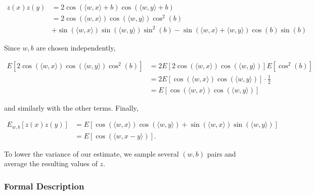 \begin{align*}
z(x)z(y) &= 2\cos(\langle w,x\rangle+b)\cos(\langle w,y\rangle+b)\\
			&= 2\cos(\langle w,x\rangle)\cos(\langle w,y\rangle)\cos^2(b) \\
				& +\sin(\langle w, x\rangle)\sin(\langle w, y\rangle)\sin^2(b) - \sin(\langle w, x\rangle+\langle w, y\rangle)\cos(b)\sin(b)
\end{align*}

Since $w,b$ are chosen independently,

\begin{align*}
E[2\cos(\langle w,x\rangle)\cos(\langle w,y\rangle)\cos^2(b)] &= 2E[2\cos(\langle w,x\rangle)\cos(\langle w,y\rangle)]E[\cos^2(b)]\\
	&= 2E[\cos(\langle w,x\rangle)\cos(\langle w,y\rangle)]\cdot \frac12 \\
	&= E[\cos(\langle w,x\rangle)\cos(\langle w,y\rangle)]
\end{align*}

and similarly with the other terms. Finally,

\begin{align*}
E_{w,b}[z(x)z(y)] &= E[\cos(\langle w,x\rangle)\cos(\langle w,y\rangle) + \sin(\langle w, x\rangle)\sin(\langle w, y\rangle)]\\
						&= E[\cos(\langle w, x-y\rangle)].
\end{align*}



To lower the variance of our estimate, we sample several $(w,b)$ pairs and
average the resulting values of $z$.\\

\subsubsection{Formal Description}


